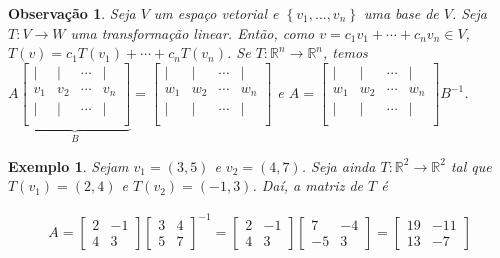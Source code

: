 \documentclass{article}
\newtheorem*{remark}{Observação}
\newtheorem*{example}{Exemplo}
\begin{document}
\begin{remark}
	Seja $V$ um espaço vetorial e $\left\{v_1, \dots, v_n\right\}$ uma base de $V$. Seja $T:V\to W$ uma transformação linear. Então, como $v = c_1v_1 + \cdots + c_nv_n\in V$, $T(v) = c_1T(v_1) + \cdots + c_nT(v_n)$. Se $T:\mathbb{R}^n\to\mathbb{R}^n$, temos $A\underbrace{\begin{bmatrix}
	\vert & \vert & \cdots & \vert \\
	v_1 & v_2 & \cdots & v_n\\
	\vert & \vert & \cdots & \vert \\
	\end{bmatrix}}_{B} = \begin{bmatrix}
	\vert & \vert & \cdots & \vert \\
	w_1 & w_2 & \cdots & w_n\\
	\vert & \vert & \cdots & \vert \\
	\end{bmatrix}$ e $A = \begin{bmatrix}
	\vert & \vert & \cdots & \vert \\
	w_1 & w_2 & \cdots & w_n\\
	\vert & \vert & \cdots & \vert \\
	\end{bmatrix}B^{-1}$.
\end{remark}

\begin{example}
	Sejam $v_1 = (3,5)$ e $v_2 = (4,7)$. Seja ainda $T:\mathbb{R}^2\to\mathbb{R}^2$ tal que $T(v_1) = (2,4)$ e $T(v_2) = (-1,3)$. Daí, a matriz de $T$ é
	
	\begin{align*}
	A = \begin{bmatrix}
	2 & -1 \\
	4 & 3
	\end{bmatrix}\begin{bmatrix}
	3 & 4 \\
	5 & 7
	\end{bmatrix}^{-1} = \begin{bmatrix}
	2 & -1 \\
	4 & 3
	\end{bmatrix}\begin{bmatrix}
	7 & -4 \\
	-5 & 3
	\end{bmatrix} = \begin{bmatrix}
	19 & -11 \\
	13 & -7
	\end{bmatrix}
	\end{align*}
	
\end{example}
\end{document}
